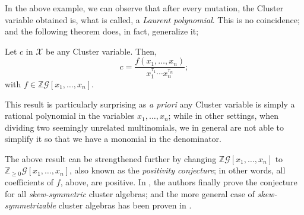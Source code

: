In the above example, we can observe that after every mutation, the Cluster variable obtained is, what is called, a \emph{Laurent polynomial}. This is no coincidence; and the following theorem does, in fact, generalize it;
\begin{theorem}
Let $c$ in $\mathcal{X}$ be any Cluster variable. Then,
\begin{equation*}
    c = \dfrac{f(x_1,\dots,x_n)}{x_1^{\tau_1}\cdots x_n^{\tau_n}};
\end{equation*}
with $f \in \mathbb{Z}\mathcal{G}[x_1,\dots,x_n]$.
\end{theorem}
This result is particularly surprising as \emph{a priori} any Cluster variable is simply a rational polynomial in the variables $x_1,\dots,x_n$; while in other settings, when dividing two seemingly unrelated multinomials, we in general are not able to simplify it so that we have a monomial in the denominator. 
\begin{remark}
The above result can be strengthened further by changing $\mathbb{Z}\mathcal{G}[x_1,\dots,x_n]$ to $\mathbb{Z}_{\geq 0}\mathcal{G}[x_1,\dots,x_n]$, also known as the \emph{positivity conjecture}; in other words, all coefficients of $f$, above, are positive. In \cite{LS}, the authors finally prove the conjecture for all \emph{skew-symmetric} cluster algebras; and the more general case of \emph{skew-symmetrizable} cluster algebras has been proven in \cite{GHKK}.
\end{remark}
